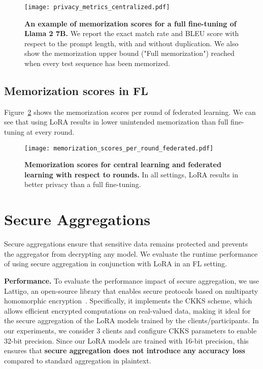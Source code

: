 \begin{figure}[ht]
\begin{center}
\centerline{\texttt{[image: privacy\_metrics\_centralized.pdf]}}

\caption{\textbf{An example of memorization scores for a full fine-tuning of Llama 2 7B.} We report the exact match rate and BLEU score with respect to the prompt length, with and without duplication. We also show the memorization upper bound ("Full memorization") reached when every test sequence has been memorized.}
\label{fig-privacy-metrics}
\end{center}
\vskip -0.2in
\end{figure}

\subsection{Memorization scores in FL}
\label{sec:mem_fl}
Figure~\ref{fig-fl-round-privacy} shows the memorization scores per round of federated learning. We can see that using LoRA results in lower unintended memorization than full fine-tuning at every round.

\begin{figure}[ht]
\vskip 0.2in
\begin{center}
\centerline{\texttt{[image: memorization\_scores\_per\_round\_federated.pdf]}}
\caption{\textbf{Memorization scores for central learning and federated learning with respect to rounds.} In all settings, LoRA results in better privacy than a full fine-tuning.}
\label{fig-fl-round-privacy}
\end{center}
\vskip -0.2in
\end{figure}

\section{Secure Aggregations}
\label{sec:sec_agg}

Secure aggregations ensure that sensitive data remains protected and prevents the aggregator from decrypting any model.
We evaluate the runtime performance of using secure aggregation in conjunction with LoRA in an FL setting. 

\textbf{Performance.}
To evaluate the performance impact of secure aggregation, we use Lattigo, an open-source library that enables secure protocols based on multiparty homomorphic encryption~\cite{lattigo, mouchet2020lattigo}. Specifically, it implements the CKKS scheme, which allows efficient encrypted computations on real-valued data, making it ideal for the secure aggregation of the LoRA models trained by the clients/participants. In our experiments, we consider 3 clients and configure CKKS parameters to enable 32-bit precision. Since our LoRA models are trained with 16-bit precision, this ensures that \textbf{secure aggregation does not introduce any accuracy loss} compared to standard aggregation in plaintext.

